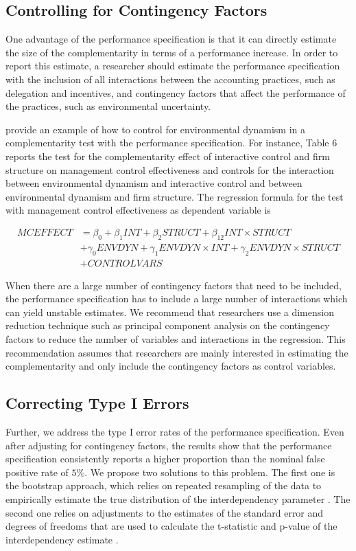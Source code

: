 \documentclass[12pt]{article}
\begin{document}
\subsection{Controlling for Contingency Factors}

One advantage of the performance specification is that it can directly estimate the size of the complementarity in terms of a performance increase. In order to report this estimate, a researcher should estimate the performance specification with the inclusion of all interactions between the accounting practices, such as delegation and incentives, and contingency factors that affect the performance of the practices, such as environmental uncertainty. 

\citet{bedford_management_2016} provide an example of how to control for environmental dynamism in a complementarity test with the performance specification. For instance, Table 6 reports the test for the complementarity effect of interactive control and firm structure on management control effectiveness and controls for the interaction between environmental dynamism and interactive control and between environmental dynamism and firm structure. The regression formula for the test with management control effectiveness as dependent variable is 

\begin{align*}
MCEFFECT &= \beta_0 + \beta_1 INT + \beta_2 STRUCT + \beta_{12} INT \times STRUCT \\
&+\gamma_0 ENVDYN + \gamma_1 ENVDYN \times INT + \gamma_2 ENVDYN\times STRUCT \\
&+ CONTROLVARS 
\end{align*}

When there are a large number of contingency factors that need to be included, the performance specification has to include a large number of interactions which can yield unstable estimates. We recommend that researchers use a dimension reduction technique such as principal component analysis on the contingency factors to reduce the number of variables and interactions in the regression. This recommendation assumes that researchers are mainly interested in estimating the complementarity and only include the contingency factors as control variables.

\subsection{Correcting Type I Errors}

Further, we address the type I error rates of the performance specification. Even after adjusting for contingency factors, the results show that the performance specification consistently reports a higher proportion than the nominal false positive rate of $5\%$. We propose two solutions to this problem. The first one is the bootstrap approach, which relies on repeated resampling of the data to empirically estimate the true distribution of the interdependency parameter \citep{efron_computer_2017}. The second one relies on adjustments to the estimates of the standard error and degrees of freedoms that are used to calculate the t-statistic and p-value of the interdependency estimate \citep{young_improved_2016}.
\end{document}
